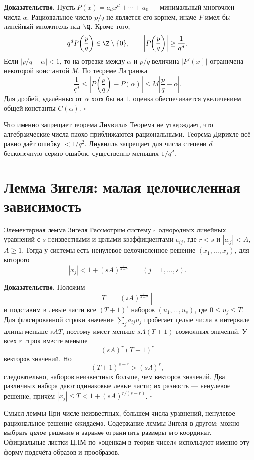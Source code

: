 \textbf{Доказательство.}
Пусть $P(x)=a_dx^d+\cdots+a_0$ --- минимальный многочлен числа
$\alpha$. Рациональное число $p/q$ не является его корнем, иначе
$P$ имел бы линейный множитель над $\Q$. Кроме того,
\[
  q^dP\!\left(\frac pq\right)\in\Z\setminus\{0\},
  \qquad
  \left|P\!\left(\frac pq\right)\right|\ge\frac1{q^d}.
\]
Если $|p/q-\alpha|<1$, то на отрезке между $\alpha$ и $p/q$ величина
$|P'(x)|$ ограничена некоторой константой $M$. По теореме Лагранжа
\[
  \frac1{q^d}
  \le\left|P\!\left(\frac pq\right)-P(\alpha)\right|
  \le M\left|\frac pq-\alpha\right|.
\]
Для дробей, удалённых от $\alpha$ хотя бы на $1$, оценка обеспечивается
увеличением общей константы $C(\alpha)$. \hfill$\square$

\begin{commentbox}{Что именно запрещает теорема Лиувилля}
Теорема не утверждает, что алгебраические числа плохо приближаются
рациональными. Теорема Дирихле всё равно даёт ошибку $<1/q^2$.
Лиувилль запрещает для числа степени $d$ бесконечную серию ошибок,
существенно меньших $1/q^d$.
\end{commentbox}

\section{Лемма Зигеля: малая целочисленная зависимость}

\begin{theorembox}{Элементарная лемма Зигеля}
Рассмотрим систему $r$ однородных линейных уравнений с $s$ неизвестными
и целыми коэффициентами $a_{ij}$, где $r<s$ и $|a_{ij}|<A$,
$A\ge1$. Тогда у системы есть ненулевое целочисленное решение
$(x_1,\ldots,x_s)$, для которого
\[
  |x_j|<1+(sA)^{\frac r{s-r}}
  \qquad (j=1,\ldots,s).
\]
\end{theorembox}

\textbf{Доказательство.}
Положим
\[
  T=\left\lfloor(sA)^{\frac r{s-r}}\right\rfloor
\]
и подставим в левые части все $(T+1)^s$ наборов
$(u_1,\ldots,u_s)$, где $0\le u_j\le T$. Для фиксированной строки
значение $\sum_j a_{ij}u_j$ пробегает целые числа в интервале длины
меньше $sAT$, поэтому имеет меньше $sA(T+1)$ возможных значений.
У всех $r$ строк вместе меньше
\[
  (sA)^r(T+1)^r
\]
векторов значений. Но
\[
  (T+1)^{s-r}>(sA)^r,
\]
следовательно, наборов неизвестных больше, чем векторов значений.
Два различных набора дают одинаковые левые части; их разность ---
ненулевое решение, причём $|x_j|\le T<1+(sA)^{r/(s-r)}$.
\hfill$\square$

\begin{commentbox}{Смысл леммы}
При числе неизвестных, большем числа уравнений, ненулевое рациональное
решение ожидаемо. Содержание леммы Зигеля в другом: можно выбрать
\emph{целое} решение и заранее ограничить размеры его координат.
Официальные листки ЦПМ по «оценкам в теории чисел» используют именно
эту форму подсчёта образов и прообразов.
\end{commentbox}

